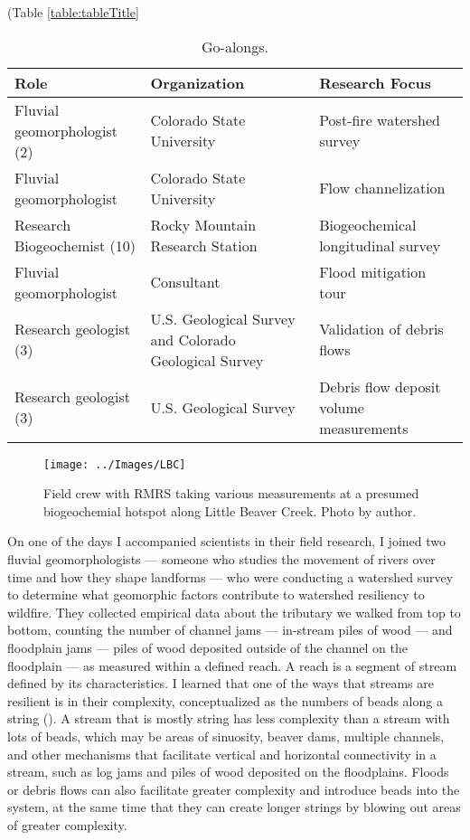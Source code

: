 \documentclass[
]{article}
\begin{document}
(Table \ref{table:tableTitle}

\begin{table}[!h]
\centering\centering
\caption{\label{tab:IntroTable2}Go-alongs.}
\centering
\begin{tabu} to 
\toprule
Role & Organization & Research Focus\\
\midrule
Fluvial geomorphologist (2) & Colorado State University & Post-fire watershed survey\\
Fluvial geomorphologist & Colorado State University & Flow channelization\\
Research Biogeochemist (10) & Rocky Mountain Research Station & Biogeochemical longitudinal survey\\
Fluvial geomorphologist & Consultant & Flood mitigation tour\\
Research geologist (3) & U.S. Geological Survey and Colorado Geological Survey & Validation of debris flows\\
\addlinespace
Research geologist (3) & U.S. Geological Survey & Debris flow deposit volume measurements\\
\bottomrule
\end{tabu}
\end{table}

\begin{figure}
\texttt{[image: ../Images/LBC]} \caption[Little Beaver Creek survey]{Field crew with RMRS taking various measurements at a presumed biogeochemial hotspot along Little Beaver Creek. Photo by author.}\label{fig:figureTitle-24}
\end{figure}

On one of the days I accompanied scientists in their field research, I joined two fluvial geomorphologists --- someone who studies the movement of rivers over time and how they shape landforms --- who were conducting a watershed survey to determine what geomorphic factors contribute to watershed resiliency to wildfire. They collected empirical data about the tributary we walked from top to bottom, counting the number of channel jams --- in-stream piles of wood --- and floodplain jams --- piles of wood deposited outside of the channel on the floodplain --- as measured within a defined reach. A reach is a segment of stream defined by its characteristics. I learned that one of the ways that streams are resilient is in their complexity, conceptualized as the numbers of beads along a string (). A stream that is mostly string has less complexity than a stream with lots of beads, which may be areas of sinuosity, beaver dams, multiple channels, and other mechanisms that facilitate vertical and horizontal connectivity in a stream, such as log jams and piles of wood deposited on the floodplains. Floods or debris flows can also facilitate greater complexity and introduce beads into the system, at the same time that they can create longer strings by blowing out areas of greater complexity.
\end{document}
